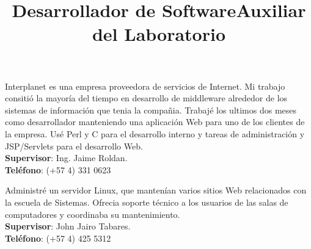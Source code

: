 \begin{resume}
\title{\textbf{Desarrollador de Software}}
\begin{position}
Interplanet es una empresa proveedora de servicios de Internet. Mi trabajo consiti\'{o} la mayor\'{i}a del tiempo en desarrollo de middleware alrededor de los sistemas de informaci\'{o}n que tenia  la compa\~{n}ia.
Trabaj\'{e} los ultimos dos meses como desarrollador manteniendo una aplicaci\'{o}n Web para uno de los clientes de la empresa. Us\'{e} Perl y C para el desarrollo interno y tareas de administraci\'{o}n y JSP/Servlets para el desarrollo Web.\\
\textbf{Supervisor}:  Ing. Jaime Roldan.\\
\textbf{Tel\'{e}fono}:  (+57 4) 331 0623 
\end{position}
\newline

\title{\textbf{Auxiliar del Laboratorio}}
\begin{position}
Administr\'{e} un servidor Linux, que manten\'{i}an varios sitios Web relacionados con la escuela de Sistemas. Ofrecia 
soporte t\'{e}cnico a los usuarios de las salas de computadores y coordinaba su mantenimiento.\\
\textbf{Supervisor}:  John Jairo Tabares.\\
\textbf{Tel\'{e}fono}:  (+57 4) 425 5312 
\end{position}
\newline






\end{resume}
